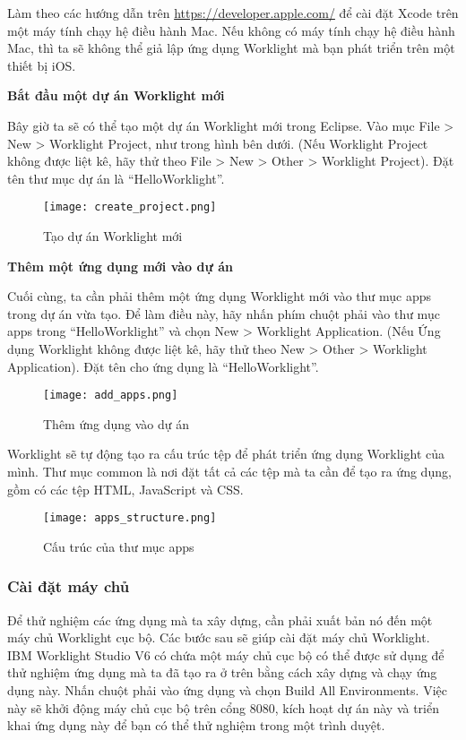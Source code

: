  Làm theo các hướng dẫn trên \url{https://developer.apple.com/} để cài đặt Xcode trên một máy tính chạy hệ điều hành Mac. Nếu không có máy tính chạy hệ điều hành Mac, thì ta sẽ không thể giả lập ứng dụng Worklight mà bạn phát triển trên một thiết bị iOS.
 
 \textbf{Bắt đầu một dự án Worklight mới}
 
 Bây giờ ta sẽ có thể tạo một dự án Worklight mới trong Eclipse. Vào mục File > New > Worklight Project, như trong hình bên dưới. (Nếu Worklight Project không được liệt kê, hãy thử theo File > New > Other > Worklight Project). Đặt tên thư mục dự án là “HelloWorklight”.
 
 \begin{figure}[!htb] 
 \centering
 \texttt{[image: create\_project.png]}
 \caption{Tạo dự án Worklight mới}
 \end{figure}

\textbf{Thêm một ứng dụng mới vào dự án}

Cuối cùng, ta cần phải thêm một ứng dụng Worklight mới vào thư mục apps trong dự án vừa tạo. Để làm điều này, hãy nhấn phím chuột phải vào thư mục apps trong “HelloWorklight” và chọn New > Worklight Application. (Nếu Ứng dụng Worklight không được liệt kê, hãy thử theo New > Other > Worklight Application). Đặt tên cho ứng dụng là “HelloWorklight”.

 \begin{figure}[!htb] 
 \centering
 \texttt{[image: add\_apps.png]}
 \caption{Thêm ứng dụng vào dự án}
 \end{figure}
 
Worklight sẽ tự động tạo ra cấu trúc tệp để phát triển ứng dụng Worklight của mình. Thư mục common là nơi đặt tất cả các tệp mà ta cần để tạo ra ứng dụng, gồm có các tệp HTML, JavaScript và CSS.

 \begin{figure}[!htb] 
 \centering
 \texttt{[image: apps\_structure.png]}
 \caption{Cấu trúc của thư mục apps}
 \end{figure}
\newpage

\subsubsection{Cài đặt máy chủ}
Để thử nghiệm các ứng dụng mà ta xây dựng, cần phải xuất bản nó đến một máy chủ Worklight cục bộ. Các bước sau sẽ giúp cài đặt máy chủ Worklight. IBM Worklight Studio V6 có chứa một máy chủ cục bộ có thể được sử dụng để thử nghiệm ứng dụng mà ta đã tạo ra ở trên bằng cách xây dựng và chạy ứng dụng này. Nhấn chuột phải vào ứng dụng và chọn Build All Environments. Việc này sẽ khởi động máy chủ cục bộ trên cổng 8080, kích hoạt dự án này và triển khai ứng dụng này để bạn có thể thử nghiệm trong một trình duyệt.

